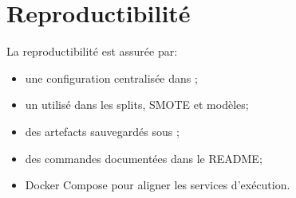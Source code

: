 \section{Reproductibilité}

La reproductibilité est assurée par:

\begin{itemize}
    \item une configuration centralisée dans ;
    \item un  utilisé dans les splits, SMOTE et modèles;
    \item des artefacts sauvegardés sous ;
    \item des commandes documentées dans le README;
    \item Docker Compose pour aligner les services d'exécution.
\end{itemize}
